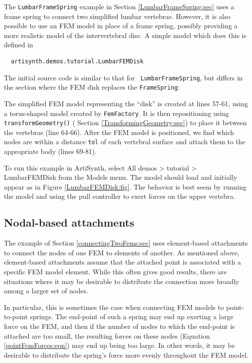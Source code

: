 The {\tt LumbarFrameSpring} example in
Section \ref{LumbarFrameSpring:sec} uses a frame spring to connect two
simplified lumbar vertebrae. However, it is also possible to use an
FEM model in place of a frame spring, possibly providing a more
realistic model of the intervertebral disc. A simple model which does
this is defined in
%
\begin{verbatim}
  artisynth.demos.tutorial.LumbarFEMDisk
\end{verbatim}
%
The initial source code is similar to that for {\tt
LumbarFrameSpring}, but differs in the section where the FEM disk
replaces the {\tt FrameSpring}:
\lstset{numbers=left}
\iflatexml

\else

\fi
\lstset{numbers=none}

The simplified FEM model representing the ``disk'' is created at lines
57-61, using a torus-shaped model created by {\tt FemFactory}.  It is
then repositioning using {\tt transformGeometry()} (
Section \ref{TransformingGeometry:sec}) to place it between the
vertebrae (line 64-66).  After the FEM model is positioned, we find
which nodes are within a distance {\tt tol} of each vertebral surface
and attach them to the appropriate body (lines 69-81).

To run this example in ArtiSynth, select {\sf All demos > tutorial >
LumbarFEMDisk} from the {\sf Models} menu. The model should load and
initially appear as in Figure \ref{LumbarFEMDisk:fig}.  The
behavior is best seem by running the model and using the pull
controller to exert forces on the upper vertebra.

\subsection{Nodal-based attachments}
\label{sec:fem:nodalAttachments}

The example of Section \ref{connectingTwoFems:sec} uses element-based
attachments to connect the nodes of one FEM to elements of another.
As mentioned above, element-based attachments assume that the attached
point is associated with a specific FEM model element. 
While this often gives good results, there are situations where it may
be desirable to distribute the connection more broadly among a larger
set of nodes. 

In particular, this is sometimes the case when connecting FEM models
to point-to-point springs. The end-point of such a spring may end up
exerting a large force on the FEM, and then if the number of nodes to
which the end-point is attached are too small, the resulting forces on
these nodes (Equation \ref{pointFemForces:eqn}) may end up being too
large. In other words, it may be desirable to distribute the spring's
force more evenly throughout the FEM model. 


